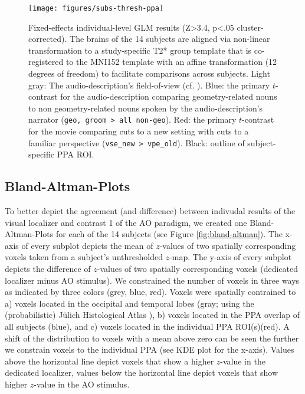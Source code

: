 \documentclass[english]{article}
\begin{document}
\begin{figure} \centering
    \texttt{[image: figures/subs-thresh-ppa]}
    \caption{Fixed-effects individual-level GLM results (Z>3.4, p<.05
        cluster-corrected). The brains of the 14 subjects are aligned via
        non-linear transformation to a study-specific T2* group template that is
    co-registered to the MNI152 template with an affine transformation (12
degrees of freedom) to facilitate comparisons across subjects.
        Light gray: The audio-description's field-of-view
        (cf. \citep{hanke2014audiomovie}).
        Blue: the primary $t$-contrast for the audio-description comparing
        geometry-related nouns to non geometry-related nouns spoken by the
        audio-description's narrator (\texttt{geo, groom > all non-geo}).
        Red: the primary $t$-contrast for the movie comparing cuts to a new
        setting with cuts to a familiar perspective (\texttt{vse\_new >
        vpe\_old}).
        Black: outline of subject-specific PPA ROI.}
\label{fig:subs-thresh-ppa}
\end{figure}


\subsection{Bland-Altman-Plots}
To better depict the agreement (and difference) between indivudal results of the
visual localizer and contrast 1 of the AO paradigm, we created one
Bland-Altman-Plots for each of the 14 subjects (see Figure
\ref{fig:bland-altman}).
The x-axis of every subplot depicts the mean of $z$-values of two spatially
corresponding voxels taken from a subject's unthresholded $z$-map.
The y-axis of every subplot depicts the difference of $z$-values of two
spatially corresponding voxels (dedicated localizer minus AO stimulus).
We constrained the number of voxels in three ways as indicated by three colors
(grey, blue, red).
Voxels were spatially contrained to a) voxels located in the occipital and
temporal lobes (gray; using the (probabilistic) Jülich Histological Atlas
\citep{eickhoff2005toolbox, eickhoff2007assignment}), b) voxels located in the
PPA overlap of all subjects (blue), and c) voxels located in the individual PPA
ROI(s)(red).
A shift of the distribution to voxels with a mean above zero can be seen the
further we constrain voxels to the individual PPA (see KDE plot for the x-axis).
Values above the horizontal line depict voxels that show a higher $z$-value in
the dedicated localizer, values below the horizontal line depict voxels that
show higher $z$-value in the AO stimulus.
\end{document}
